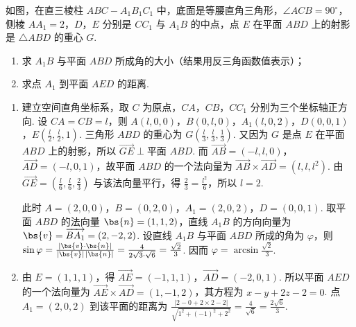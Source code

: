 \begin{problem}
如图，在直三棱柱 \(ABC-A_{1}B_{1}C_{1}\) 中，底面是等腰直角三角形，\(\angle ACB=90^{\circ}\)，侧棱 \(AA_{1}=2\)，\(D\)，\(E\) 分别是 \(CC_{1}\) 与 \(A_{1}B\) 的中点，点 \(E\) 在平面 \(ABD\) 上的射影是 \(\triangle ABD\) 的重心 \(G\).

\begin{enumerate}
\item 求 \(A_{1}B\) 与平面 \(ABD\) 所成角的大小（结果用反三角函数值表示）；
\item 求点 \(A_{1}\) 到平面 \(AED\) 的距离.
\end{enumerate}

\begin{center}
\end{center}

\begin{solution}
\begin{enumerate}
\item 建立空间直角坐标系，取 \(C\) 为原点，\(CA\)，\(CB\)，\(CC_{1}\) 分别为三个坐标轴正方向. 设 \(CA=CB=l\)，则
\(A(l,0,0)\)，\(B(0,l,0)\)，\(A_{1}(l,0,2)\)，\(D\left(0,0,1\right)\)，\(E\left(\frac{l}{2},\frac{l}{2},1\right)\). 三角形 \(ABD\) 的重心为 \(G\left(\frac{l}{3},\frac{l}{3},\frac{1}{3}\right)\). 又因为 \(G\) 是点 \(E\) 在平面 \(ABD\) 上的射影，所以 \(\overrightarrow{GE}\perp\text{平面 }ABD\). 而 \(\overrightarrow{AB}=(-l,l,0)\)，\(\overrightarrow{AD}=(-l,0,1)\)，故平面 \(ABD\) 的一个法向量为 \(\overrightarrow{AB}\times\overrightarrow{AD}=(l,l,l^{2})\). 由 \(\overrightarrow{GE}=\left(\frac{l}{6},\frac{l}{6},\frac{2}{3}\right)\) 与该法向量平行，得 \(\frac{2}{3}=\frac{l^{2}}{6}\)，所以 \(l=2\).

此时 \(A=(2,0,0)\)，\(B=(0,2,0)\)，\(A_{1}=(2,0,2)\)，\(D=(0,0,1)\). 取平面 \(ABD\) 的法向量 \(\bs{n}=(1,1,2)\)，直线 \(A_{1}B\) 的方向向量为 \(\bs{v}=\overrightarrow{BA_{1}}=(2,-2,2)\). 设直线 \(A_{1}B\) 与平面 \(ABD\) 所成的角为 \(\varphi\)，则 \(\sin\varphi=\frac{|\bs{v}\cdot\bs{n}|}{|\bs{v}|\,|\bs{n}|}=\frac{4}{2\sqrt{3}\cdot\sqrt{6}}=\frac{\sqrt{2}}{3}\). 因而 \(\varphi=\arcsin\frac{\sqrt{2}}{3}\).
\item 由 \(E=(1,1,1)\)，得 \(\overrightarrow{AE}=(-1,1,1)\)，\(\overrightarrow{AD}=(-2,0,1)\). 所以平面 \(AED\) 的一个法向量为 \(\overrightarrow{AE}\times\overrightarrow{AD}=(1,-1,2)\)，其方程为 \(x-y+2z-2=0\). 点 \(A_{1}=(2,0,2)\) 到该平面的距离为 \(\frac{|2-0+2\times2-2|}{\sqrt{1^{2}+(-1)^{2}+2^{2}}}=\frac{4}{\sqrt{6}}=\frac{2\sqrt{6}}{3}\).
\end{enumerate}
\end{solution}
\end{problem}


